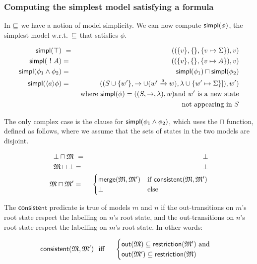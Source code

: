 \subsubsection{Computing the simplest model satisfying a formula}

\NI In $\sqsubseteq$ we have a notion of model simplicity.  We can now
compute $\mathsf{simpl}(\phi)$, the simplest model w.r.t.~$\sqsubseteq$ that
satisfies $\phi$.

\begin{eqnarray*}
  \mathsf{simpl}(\top) &\ = \ & ( (\{v\}, \{\}, \{v \mapsto \Sigma\}), v)  \\
  \mathsf{simpl}(\ ! \  A) & = & ( (\{v\}, \{\}, \{v \mapsto A\}), v)  \\
  \mathsf{simpl}(\phi_1 \land \phi_2) & = & \mathsf{simpl}(\phi_1) \sqcap \mathsf{simpl}(\phi_2)  \\
  \mathsf{simpl}(\langle a \rangle \phi) 
     & = & ( (S \cup \{w'\}, \rightarrow \cup (w' \xrightarrow{a} w), \lambda \cup \{w' \mapsto \Sigma\}]), w')  \\
		& & \mbox{where }\mathsf{simpl}(\phi) = ( (S, \rightarrow, \lambda), w) \mbox{and } w' \mbox{ is a new state} \\
                &&  \mbox{not appearing in }S 
\end{eqnarray*}

\NI The only complex case is the clause for $\mathsf{simpl}(\phi_1 \land \phi_2)$,
which uses the $\sqcap$ function, defined as follows, where we assume
that the sets of states in the two models are disjoint.

\begin{eqnarray*}
  \bot \sqcap \MMM  &\ =\ &  \bot  \\
  \MMM \sqcap \bot      & = &  \bot  
     \\
  \MMM \sqcap \MMM'
     & = & 
  \begin{cases}
    \mathsf{merge}(\MMM, \MMM') & \text{if}\ \mathsf{consistent}(\MMM, \MMM') \\
    \bot & \text{else}
  \end{cases}
\end{eqnarray*}

\NI The $\mathsf{consistent}$ predicate is true of models $m$ and $n$ if
the out-transitions on $m$'s root state respect the labelling on $n$'s
root state, and the out-transitions on $n$'s root state respect the
labelling on $m$'s root state. In other words:

\begin{eqnarray*}
  \mathsf{consistent}(\frak{M}, \frak{M}') 
     &\ \mbox{ iff }\ & 
  \begin{cases}
    \mathsf{out}(\frak{M}) \subseteq \mathsf{restriction}(\frak{M}') \mbox{ and}  \\
    \mathsf{out}(\frak{M}') \subseteq \mathsf{restriction}(\frak{M}) 
  \end{cases}
\end{eqnarray*}

